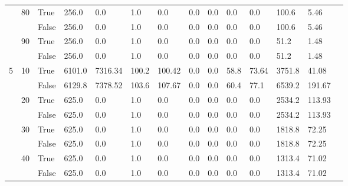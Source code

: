 \begin{landscape}
\begin{small}
\begin{longtable}[c]{@{}lll|ll|ll|ll|ll|lll@{}}
   & 80 & True  & 256.0           & 0.0            & 1.0           & 0.0           & 0.0           & 0.0           & 0.0           & 0.0           & 100.6         & 5.46        &  \\
   &    & False & 256.0           & 0.0            & 1.0           & 0.0           & 0.0           & 0.0           & 0.0           & 0.0           & 100.6         & 5.46        &  \\
   & 90 & True  & 256.0           & 0.0            & 1.0           & 0.0           & 0.0           & 0.0           & 0.0           & 0.0           & 51.2          & 1.48        &  \\
   &    & False & 256.0           & 0.0            & 1.0           & 0.0           & 0.0           & 0.0           & 0.0           & 0.0           & 51.2          & 1.48        &  \\
  \midrule
5  & 10 & True  & 6101.0          & 7316.34        & 100.2         & 100.42        & 0.0           & 0.0           & 58.8          & 73.64         & 3751.8        & 41.08       &  \\
   &    & False & 6129.8          & 7378.52        & 103.6         & 107.67        & 0.0           & 0.0           & 60.4          & 77.1          & 6539.2        & 191.67      &  \\
   & 20 & True  & 625.0           & 0.0            & 1.0           & 0.0           & 0.0           & 0.0           & 0.0           & 0.0           & 2534.2        & 113.93      &  \\
   &    & False & 625.0           & 0.0            & 1.0           & 0.0           & 0.0           & 0.0           & 0.0           & 0.0           & 2534.2        & 113.93      &  \\
   & 30 & True  & 625.0           & 0.0            & 1.0           & 0.0           & 0.0           & 0.0           & 0.0           & 0.0           & 1818.8        & 72.25       &  \\
   &    & False & 625.0           & 0.0            & 1.0           & 0.0           & 0.0           & 0.0           & 0.0           & 0.0           & 1818.8        & 72.25       &  \\
   & 40 & True  & 625.0           & 0.0            & 1.0           & 0.0           & 0.0           & 0.0           & 0.0           & 0.0           & 1313.4        & 71.02       &  \\
   &    & False & 625.0           & 0.0            & 1.0           & 0.0           & 0.0           & 0.0           & 0.0           & 0.0           & 1313.4        & 71.02       &  \\

\end{longtable}
\end{small}
\end{landscape}
